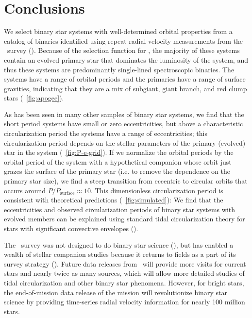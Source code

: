 \documentclass[modern, letterpaper]{aastex62}
\newcommand{\apogee}{\project{\acronym{APOGEE}}}
\newcommand{\Psurf}{\ensuremath{P_\textrm{surface}}}
\begin{document}
\section{Conclusions}

We select binary star systems with well-determined orbital properties from a
catalog of binaries identified using repeat radial velocity measurements from
the \apogee\ survey (\citealt{Price-Whelan:2018}).
Because of the selection function for \apogee, the majority of these systems
contain an evolved primary star that dominates the luminosity of the system, and
thus these systems are predominantly single-lined spectroscopic binaries.
The systems have a range of orbital periods and the primaries have a range of
surface gravities, indicating that they are a mix of subgiant, giant branch, and
red clump stars (\figurename~\ref{fig:apogee}).

As has been seen in many other samples of binary star systems, we find that the
short period systems have small or zero eccentricities, but above a
characteristic circularization period the systems have a range of
eccentricities; this circularization period depends on the stellar parameters of
the primary (evolved) star in the system (\figurename~\ref{fig:P-e-grid}).
If we normalize the orbital periods by the orbital period of the system with a
hypothetical companion whose orbit just grazes the surface of the primary star
(i.e. to remove the dependence on the primary star size), we find a steep
transition from eccentric to circular orbits that occurs around $P / \Psurf
\approx 10$.
This dimensionless circularization period is consistent with theoretical
predictions (\figurename~\ref{fig:simulated}):
We find that the eccentricities and observed circularization periods of binary
star systems with evolved members can be explained using standard tidal
circularization theory for stars with significant convective envelopes
(\citealt{Zahn:1977, Zahn:1989, Verbunt:1995}).

The \apogee\ survey was not designed to do binary star science
(\citealt{Majewski:2017}), but has enabled a wealth of stellar companion studies
because it returns to fields as a part of its survey strategy
(\citealt{Troup:2016, Badenes:2018, Price-Whelan:2018}).
Future data releases from \apogee\ will provide more visits for current stars
and nearly twice as many sources, which will allow more detailed studies of
tidal circularization and other binary star phenomena.
However, for bright stars, the end-of-mission data release of the 
mission will revolutionize binary star science by providing time-series radial
velocity information for nearly 100 million stars.
\end{document}
